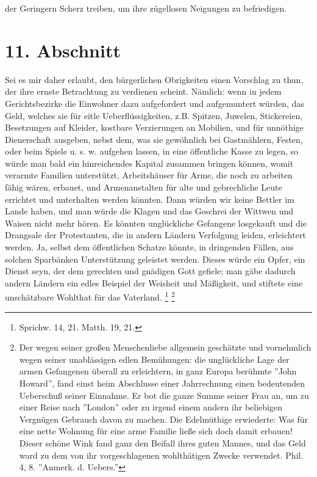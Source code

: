 der Geringern Scherz treiben, um ihre zügellosen Neigungen zu befriedigen.

\section{11. Abschnitt}

Sei es mir daher erlaubt, den bürgerlichen Obrigkeiten einen Vorschlag zu thun, der ihre ernste Betrachtung zu verdienen scheint. Nämlich: wenn in jedem Gerichtsbezirke die Einwohner dazu aufgefordert und aufgemuntert würden, das Geld, welches sie für eitle Ueberflüssigkeiten, z.B. Spitzen, Juwelen, Stickereien, Besetzungen auf Kleider, kostbare Verzierungen an Mobilien, und für unnöthige Dienerschaft ausgeben, nebst dem, was sie gewöhnlich bei Gastmählern, Festen, oder beim Spiele u. s. w. aufgehen lassen, in eine öffentliche Kasse zu legen, so würde man bald ein hinreichendes Kapital zusammen bringen können, womit verarmte Familien unterstützt, Arbeitshäuser für Arme, die noch zu arbeiten fähig wären, erbauet, und Armenanstalten für alte und gebrechliche Leute errichtet und unterhalten werden könnten. Dann
würden wir keine Bettler im Lande haben, und man würde die Klagen und das Geschrei der Wittwen und Waisen nicht mehr hören. Es könnten unglückliche Gefangene losgekauft und die Drangsale der Protestanten, die in andern Ländern Verfolgung leiden, erleichtert werden. Ja,
selbst dem öffentlichen Schatze könnte, in dringenden Fällen, aus solchen Sparbänken Unterstützung geleistet werden. Dieses würde ein Opfer, ein Dienst seyn, der dem gerechten und gnädigen Gott gefiele; man gäbe dadurch andern Ländern ein edles Beispiel der Weisheit und Mäßigkeit, und stiftete eine unschätzbare Wohlthat für das Vaterland.
\footnote{Sprichw. 14, 21. Matth. 19, 21.} \footnote{Der wegen seiner großen Menschenliebe allgemein geschätzte und vornehmlich wegen seiner unablässigen edlen Bemühungen: die unglückliche Lage der armen Gefangenen überall zu erleichtern, in ganz Europa berühmte ''John Howard'', fand einst heim Abschlusse einer Jahrrechnung einen bedeutenden Ueberschuß seiner Einnahme. Er bot die ganze Summe seiner Frau an, um zu einer Reise nach ''London'' oder zu irgend einem andern ihr beliebigen Vergnügen Gebrauch davon zu machen. Die Edelmüthige erwiederte: Was für eine nette Wohnung für eine arme Familie ließe sich doch damit erbauen! Dieser schöne Wink fand ganz den Beifall
ihres guten Mannes, und das Geld ward zu dem von ihr vorgeschlagenen wohlthätigen Zwecke verwendet. Phil. 4, 8.
''Anmerk. d. Uebers.''}


